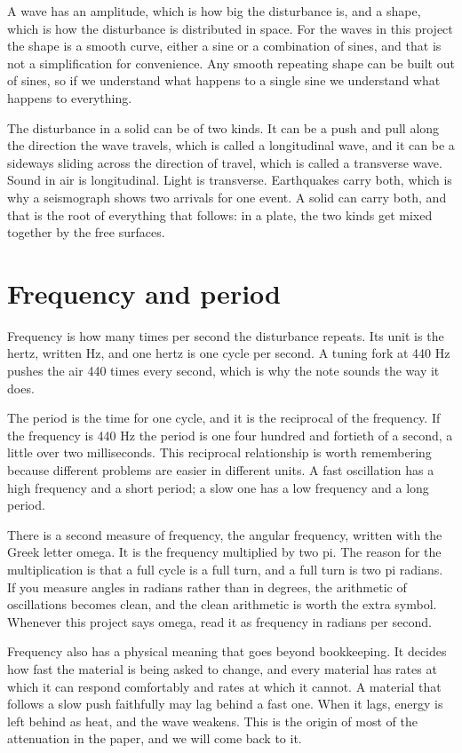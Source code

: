 \documentclass[11pt]{article}
\begin{document}
A wave has an amplitude, which is how big the disturbance is, and a shape, which is how the disturbance is
distributed in space. For the waves in this project the shape is a smooth curve, either a sine or a
combination of sines, and that is not a simplification for convenience. Any smooth repeating shape can be
built out of sines, so if we understand what happens to a single sine we understand what happens to
everything.

The disturbance in a solid can be of two kinds. It can be a push and pull along the direction the wave
travels, which is called a longitudinal wave, and it can be a sideways sliding across the direction of
travel, which is called a transverse wave. Sound in air is longitudinal. Light is transverse. Earthquakes
carry both, which is why a seismograph shows two arrivals for one event. A solid can carry both, and that is
the root of everything that follows: in a plate, the two kinds get mixed together by the free surfaces.

\section{Frequency and period}

Frequency is how many times per second the disturbance repeats. Its unit is the hertz, written Hz, and one
hertz is one cycle per second. A tuning fork at 440 Hz pushes the air 440 times every second, which is why
the note sounds the way it does.

The period is the time for one cycle, and it is the reciprocal of the frequency. If the frequency is 440 Hz
the period is one four hundred and fortieth of a second, a little over two milliseconds. This reciprocal
relationship is worth remembering because different problems are easier in different units. A fast
oscillation has a high frequency and a short period; a slow one has a low frequency and a long period.

There is a second measure of frequency, the angular frequency, written with the Greek letter omega. It is
the frequency multiplied by two pi. The reason for the multiplication is that a full cycle is a full turn,
and a full turn is two pi radians. If you measure angles in radians rather than in degrees, the arithmetic of
oscillations becomes clean, and the clean arithmetic is worth the extra symbol. Whenever this project says
omega, read it as frequency in radians per second.

Frequency also has a physical meaning that goes beyond bookkeeping. It decides how fast the material is
being asked to change, and every material has rates at which it can respond comfortably and rates at which it
cannot. A material that follows a slow push faithfully may lag behind a fast one. When it lags, energy is
left behind as heat, and the wave weakens. This is the origin of most of the attenuation in the paper, and
we will come back to it.
\end{document}
